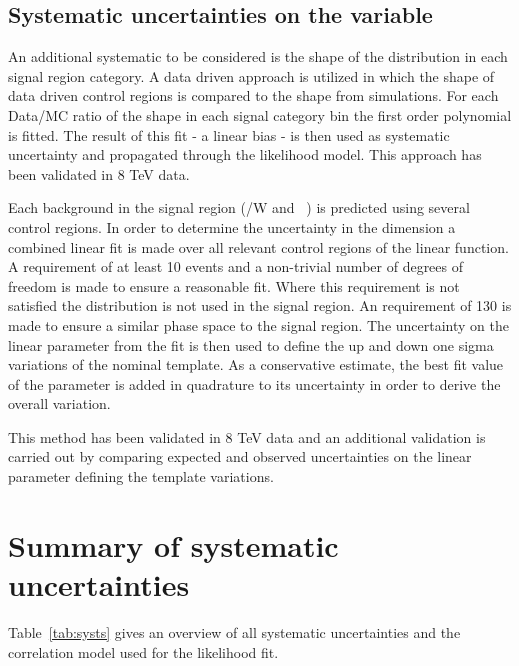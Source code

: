 \subsection{Systematic uncertainties on the \mht variable}

An additional systematic to be considered is the shape of the \mht distribution in each signal region category. 
A data driven approach is utilized in which the shape of data driven control regions is compared to the \mht shape from simulations.
For each Data/MC ratio of the shape in each signal category bin the first order polynomial is fitted. The result of this fit - a linear bias - 
is then used as systematic uncertainty and propagated through the likelihood model.
This approach has been validated in 8 TeV data. 

Each background in the signal region (\ttbar/W  and \zInv~) is predicted  using several control regions. 
In order to determine the uncertainty in the \mht dimension a combined linear fit is made over all relevant control regions
of the linear function. A requirement of at least 10 events and a non-trivial number of degrees of freedom
 is made to ensure a reasonable fit. Where this requirement is not satisfied the \mht distribution is not used in the signal region.
An \mht requirement of 130 \GeV is made to ensure a similar phase space to the signal region.
The uncertainty on the linear parameter from the fit is then used to define the up and down one sigma variations of the nominal template.
As a conservative estimate, the best fit value of the parameter is added in quadrature to its uncertainty in order to derive the overall variation.

This method has been validated in 8 TeV data and an additional validation is carried out by comparing expected and observed uncertainties
on the linear parameter defining the template variations.




\section{Summary of systematic uncertainties}

Table~\ref{tab:systs} gives an overview of all systematic uncertainties and the correlation model used for the likelihood fit. 

